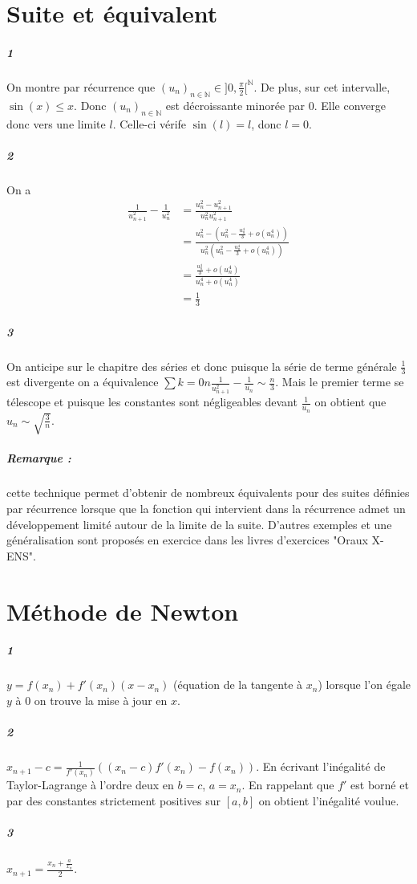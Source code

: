 \documentclass[10pt,a4paper]{article}
\newcommand{\al}[1]{\begin{aligned} #1 \end{aligned}}
\newcommand{\seq}[2]{\left( #1_{#2} \right)_{#2 \in \mathbb{N}} }
\begin{document}
\section{Suite et équivalent}

\subparagraph{1} On montre par récurrence que $\seq{u}{n} \in ]0, \frac{\pi}{2}[^{\mathbb{N}}$. De plus, sur cet intervalle, $\sin(x) \le x$. Donc $\seq{u}{n}$ est décroissante minorée par $0$. Elle converge donc vers une limite $l$. Celle-ci vérife $\sin(l) = l$, donc $l=0$.

\subparagraph{2}On a
\[
\al{
\frac{1}{u_{n+1}^2} - \frac{1}{u_n^2} &= \frac{u_n^2 - u_{n+1}^2}{u_n^2u_{n+1}^2} \\
&= \frac{u_n^2 - (u_n^2 -\frac{u_n^4}{3} + o(u_n^4))}{u_n^2 (u_n^2 -\frac{u_n^4}{3} + o(u_n^4))} \\
&= \frac{\frac{u_n^4}{3} + o(u_n^4)}{u_n^4 + o(u_n^4)} \\
&= \frac{1}{3}
}
\]

\subparagraph{3}On anticipe sur le chapitre des séries et donc puisque la série de terme générale $\frac{1}{3}$ est divergente on a équivalence $\sum{k=0}{n} \frac{1}{u_{n+1}^2} - \frac{1}{u_n} \sim \frac{n}{3}$. Mais le premier terme se télescope et puisque les constantes sont négligeables devant $\frac{1}{u_n}$ on obtient que $u_n \sim \sqrt{\frac{3}{n}}$.

\subparagraph{Remarque :} cette technique permet d'obtenir de nombreux équivalents pour des suites définies par récurrence lorsque que la fonction qui intervient dans la récurrence admet un développement limité autour de la limite de la suite. D'autres exemples et une généralisation sont proposés en exercice dans les livres d'exercices "Oraux X-ENS".

\section{Méthode de Newton}

\subparagraph{1}$y = f(x_n) + f'(x_n) (x- x_n)$ (équation de la tangente à $x_n$) lorsque l'on égale $y$ à $0$ on trouve la mise à jour en $x$. 

\subparagraph{2}$x_{n+1} -c = \frac{1}{f'(x_n)} \left( (x_n-c)f'(x_n) -f(x_n) \right)$. En écrivant l'inégalité de Taylor-Lagrange à l'ordre deux en $b = c$, $a = x_n$. En rappelant que $f'$ est borné et par des constantes strictement positives sur $[a,b]$ on obtient l'inégalité voulue.

\subparagraph{3}$x_{n+1} = \frac{x_n + \frac{a}{x_n}}{2}$.
\end{document}

